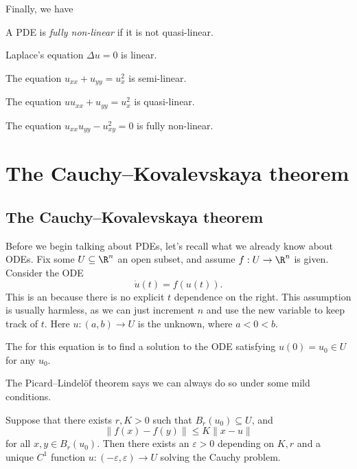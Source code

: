 \documentclass[a4paper]{article}
\begin{document}
Finally, we have
\begin{defi}
  A PDE is \emph{fully non-linear} if it is not quasi-linear.
\end{defi}

\begin{eg}
  Laplace's equation $\Delta u = 0$ is linear.
\end{eg}

\begin{eg}
  The equation $u_{xx} + u_{yy} = u_x^2$ is semi-linear.
\end{eg}

\begin{eg}
  The equation $uu_{xx} + u_{yy} = u_x^2$ is quasi-linear.
\end{eg}

\begin{eg}
  The equation $u_{xx} u_{yy} - u_{xy}^2 = 0$ is fully non-linear.
\end{eg}

\section{The Cauchy--Kovalevskaya theorem}

\subsection{The Cauchy--Kovalevskaya theorem}
Before we begin talking about PDEs, let's recall what we already know about ODEs. Fix some $U \subseteq \R^n$ an open subset, and assume $f: U \to \R^n$ is given. Consider the ODE
\[
  \dot{u}(t) = f(u(t)).
\]
This is an  because there is no explicit $t$ dependence on the right. This assumption is usually harmless, as we can just increment $n$ and use the new variable to keep track of $t$. Here $u: (a, b) \to U$ is the unknown, where $a < 0 < b$.

The  for this equation is to find a solution to the ODE satisfying $u(0) = u_0 \in U$ for any $u_0$.

The Picard--Lindel\"of theorem says we can always do so under some mild conditions.
\begin{thm}
  Suppose that there exists $r, K > 0$ such that $B_r(u_0) \subseteq U$, and
  \[
    \|f(x) - f(y)\| \leq K \|x - u\|
  \]
  for all $x, y \in B_r(u_0)$. Then there exists an $\varepsilon > 0$ depending on $K, r$ and a unique $C^1$ function $u: (-\varepsilon, \varepsilon) \to U$ solving the Cauchy problem.
\end{thm}
\end{document}
